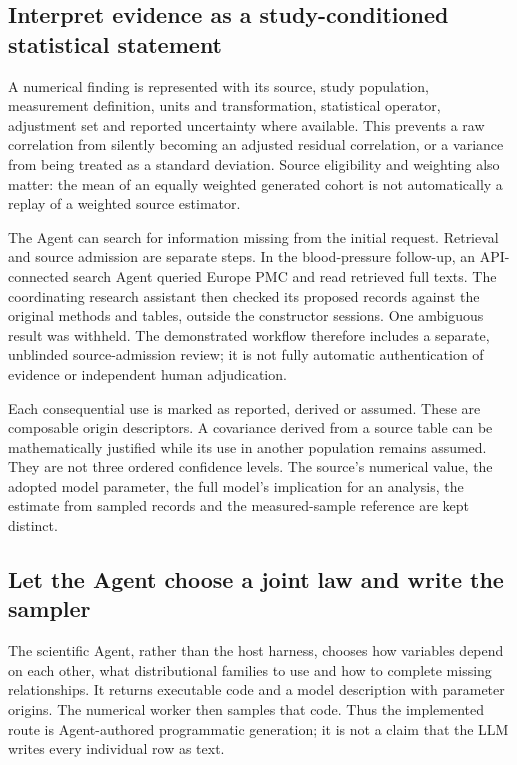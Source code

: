\documentclass[11pt,letterpaper]{article}
\begin{document}
\subsection{Interpret evidence as a study-conditioned statistical statement}

A numerical finding is represented with its source, study population, measurement definition, units and transformation, statistical operator, adjustment set and reported uncertainty where available. This prevents a raw correlation from silently becoming an adjusted residual correlation, or a variance from being treated as a standard deviation. Source eligibility and weighting also matter: the mean of an equally weighted generated cohort is not automatically a replay of a weighted source estimator.


The Agent can search for information missing from the initial request. Retrieval and source admission are separate steps. In the blood-pressure follow-up, an API-connected search Agent queried Europe PMC and read retrieved full texts. The coordinating research assistant then checked its proposed records against the original methods and tables, outside the constructor sessions. One ambiguous result was withheld. The demonstrated workflow therefore includes a separate, unblinded source-admission review; it is not fully automatic authentication of evidence or independent human adjudication.


Each consequential use is marked as reported, derived or assumed. These are composable origin descriptors. A covariance derived from a source table can be mathematically justified while its use in another population remains assumed. They are not three ordered confidence levels. The source's numerical value, the adopted model parameter, the full model's implication for an analysis, the estimate from sampled records and the measured-sample reference are kept distinct.


\subsection{Let the Agent choose a joint law and write the sampler}

The scientific Agent, rather than the host harness, chooses how variables depend on each other, what distributional families to use and how to complete missing relationships. It returns executable code and a model description with parameter origins. The numerical worker then samples that code. Thus the implemented route is Agent-authored programmatic generation; it is not a claim that the LLM writes every individual row as text.
\end{document}
